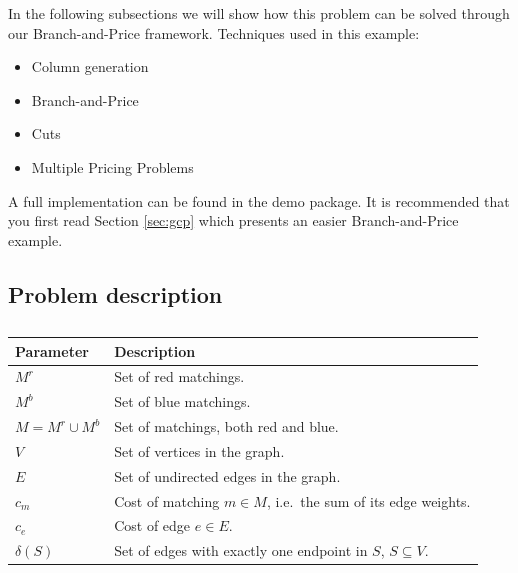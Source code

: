 \documentclass[a4paper]{article}
\begin{document}
In the following subsections we will show how this problem can be solved through our Branch-and-Price framework. Techniques used in this example:
\begin{itemize}
 \item Column generation
 \item Branch-and-Price
 \item Cuts
 \item Multiple Pricing Problems
\end{itemize}
A full implementation can be found in the demo package. It is recommended that you first read Section \ref{sec:gcp} which presents an easier Branch-and-Price example.

\subsection{Problem description}
\begin{table}[ht]
\begin{tabular}{ll}
\toprule
\textbf{Parameter} 	& \textbf{Description}\\
\midrule
$M^r$		& Set of red matchings.\\
$M^b$		& Set of blue matchings.\\
$M=M^r\cup M^b$		& Set of matchings, both red and blue.\\
$V$		& Set of vertices in the graph.\\
$E$		& Set of undirected edges in the graph.\\
$c_m$		& Cost of matching $m\in M$, i.e.\ the sum of its edge weights.\\
$c_e$		& Cost of edge $e\in E$.\\
$\delta(S)$	& Set of edges with exactly one endpoint in $S$, $S\subseteq V$.\\
\bottomrule
\end{tabular}
\caption{}
\label{tbl:tsp} 
\end{table}
\end{document}
